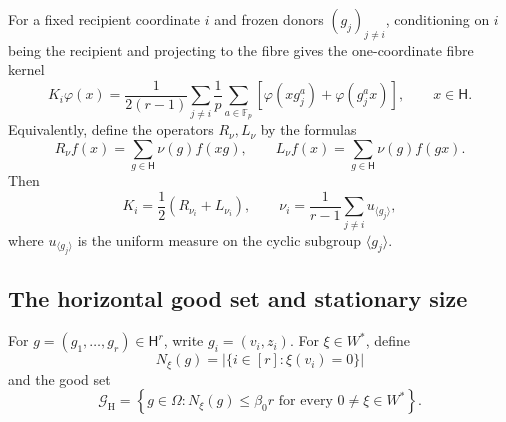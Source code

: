 \documentclass[11pt, reqno]{amsart}
\numberwithin{equation}{section}
\newcommand{\Fp}{\mathbb F_p}
\newcommand{\Heis}{\mathsf H}
\newcommand{\Good}{\mathcal G}
\begin{document}
For a fixed recipient coordinate \(i\) and frozen donors \((g_j)_{j\ne i}\),
conditioning on \(i\) being the recipient and projecting to the fibre gives the one-coordinate fibre kernel
\begin{equation}\label{eq:heis-fibre-kernel}
    K_i\varphi(x)
    =\frac1{2(r-1)}\sum_{j\ne i}\frac1p\sum_{a\in\Fp}
    \left[\varphi(xg_j^a)+\varphi(g_j^a x)\right],
    \qquad x\in\Heis.
\end{equation}
Equivalently, define the operators $R_{\nu}, L_{\nu}$ by the formulas
\begin{equation} \label{EqLeftRightDef}
R_\nu f(x)=\sum_{g\in\Heis}\nu(g)f(xg),
\qquad
L_\nu f(x)=\sum_{g\in\Heis}\nu(g)f(gx).
\end{equation}
Then 
\[
    K_i=\frac12(R_{\nu_i}+L_{\nu_i}),
    \qquad
    \nu_i=\frac1{r-1}\sum_{j\ne i}u_{\langle g_j\rangle},
\]
where \(u_{\langle g_j\rangle}\) is the uniform measure on the cyclic subgroup
\(\langle g_j\rangle\).

\subsection{The horizontal good set and stationary size}\label{subsec:heis-good-set}

For \(g=(g_1,\ldots,g_r)\in\Heis^r\), write \(g_i=(v_i,z_i)\).  For
\(\xi\in W^*\), define
\[
    N_\xi(g)=|\{i\in[r]:\xi(v_i)=0\}|
\]
and the good set 
\begin{equation}\label{eq:heis-good-set}
    \Good_{\mathrm H}
    =\left\{g\in\Omega:
    N_\xi(g)\le\beta_0r
    \text{ for every }0\ne\xi\in W^*\right\}.
\end{equation}
\end{document}
